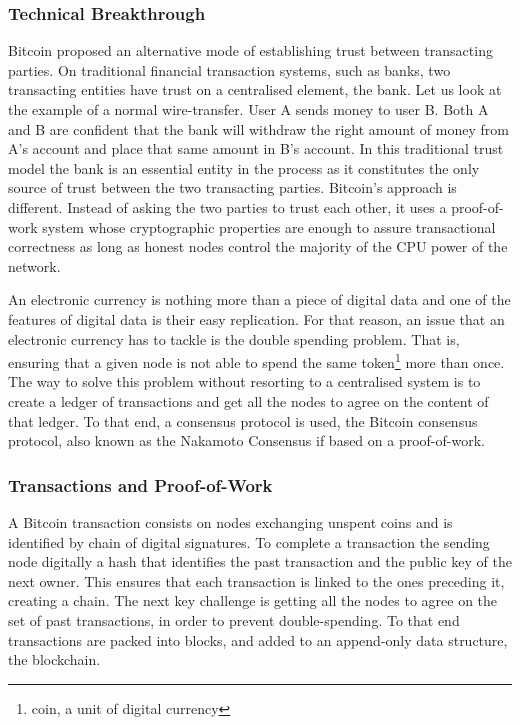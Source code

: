 \documentclass[llncsdoc]{llncs}
\begin{document}
 \subsubsection{Technical Breakthrough}
 Bitcoin proposed an alternative mode of establishing trust between transacting parties. On traditional financial transaction systems, such as banks, two transacting entities have trust on a centralised element, the bank. Let us look at the example of a normal wire-transfer. User A sends money to user B. Both A and B are confident that the bank will withdraw the right amount of money from A's account and place that same amount in B's account. In this traditional trust model the bank is an essential entity in the process as it constitutes the only source of trust between the two transacting parties. Bitcoin's approach is different. Instead of asking the two parties to trust each other, it uses a proof-of-work system whose cryptographic properties are enough to assure transactional correctness as long as honest nodes control the majority of the CPU power of the network.
 
 An electronic currency is nothing more than a piece of digital data and one of the features of digital data is their easy replication. For that reason, an issue that an electronic currency has to tackle is the double spending problem. That is, ensuring that a given node is not able to spend the same token\footnote{coin, a unit of digital currency} more than once. The way to solve this problem without resorting to a centralised system is to create a ledger of transactions and get all the nodes to agree on the content of that ledger. 
 To that end, a consensus protocol is used, the Bitcoin consensus protocol, also known as the Nakamoto Consensus if based on a proof-of-work.
 
 \subsubsection{Transactions and Proof-of-Work}
 A Bitcoin transaction consists on nodes exchanging unspent coins and is identified by chain of digital signatures. To complete a transaction the sending node digitally a hash that identifies the past transaction and the public key of the next owner. This ensures that each transaction is linked to the ones preceding it, creating a chain.
 The next key challenge is getting all the nodes to agree on the set of past transactions, in order to prevent double-spending.
 To that end transactions are packed into blocks, and added to an append-only data structure, the blockchain.
 
\end{document}
